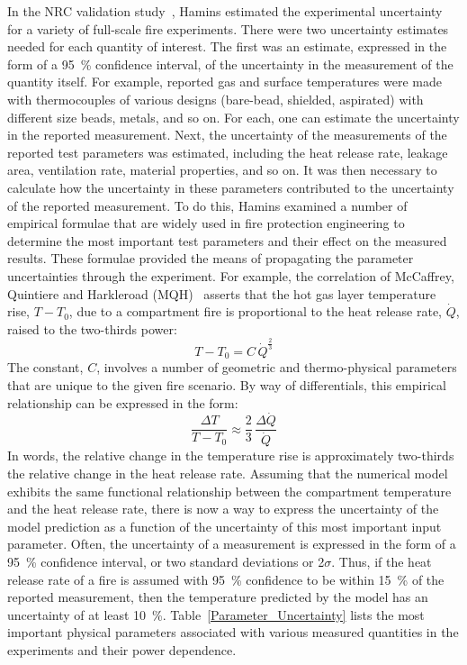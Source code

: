 \documentclass[fleqn,b5paper]{article}
\begin{document}
In the NRC validation study~\cite{NUREG_1824}, Hamins estimated the experimental uncertainty for a variety of full-scale fire experiments. There were two uncertainty estimates needed for each quantity of interest. The first was an estimate, expressed in the form of a 95~\% confidence interval, of the uncertainty in the measurement of the quantity itself. For example, reported gas and surface temperatures were made with thermocouples of various designs (bare-bead, shielded, aspirated) with different size beads, metals, and so on. For each, one can estimate the
uncertainty in the reported measurement. Next, the uncertainty of the measurements of the reported test parameters was estimated, including the heat release rate, leakage area, ventilation rate, material properties, and so on. It was then necessary to calculate how the uncertainty in these parameters contributed to the uncertainty of the reported measurement. To do this, Hamins examined a number of empirical formulae that are widely used in fire protection engineering to determine the most important test parameters and their effect on the measured results. These formulae provided the means of propagating the parameter uncertainties through the experiment. For example, the correlation of McCaffrey, Quintiere and Harkleroad (MQH)~\cite{SFPE:Walton} asserts that the hot gas layer temperature rise, $T-T_0$, due to a compartment fire is proportional to the heat release rate, $\dot{Q}$, raised to the two-thirds power:
\begin{equation}
   T-T_0 = C \, \dot{Q}^{\frac{2}{3}}
\end{equation}
The constant, $C$, involves a number of geometric and thermo-physical parameters that are unique to the given fire scenario. By way of differentials, this empirical relationship can be expressed in the form:
\begin{equation}
   \frac{\Delta T}{T-T_0} \approx \frac{2}{3} \, \frac{\Delta \dot{Q}}{\dot{Q}}
\end{equation}
In words, the relative change in the temperature rise is approximately two-thirds the relative change in the heat release rate. Assuming that the numerical model exhibits the same functional relationship between the compartment temperature and the heat release rate, there is now a way to express the uncertainty of the model prediction as a function of the uncertainty of this most important input parameter. Often, the uncertainty of a measurement is expressed in the form of a 95~\% confidence interval, or two standard deviations or 2$\sigma$.
Thus, if the heat release rate of a fire is assumed with 95~\% confidence to be within 15~\% of the reported measurement, then the temperature predicted by the model has an uncertainty of at least 10~\%. Table~\ref{Parameter_Uncertainty} lists the most important physical parameters associated with various measured quantities in the experiments and their power dependence.
\end{document}
